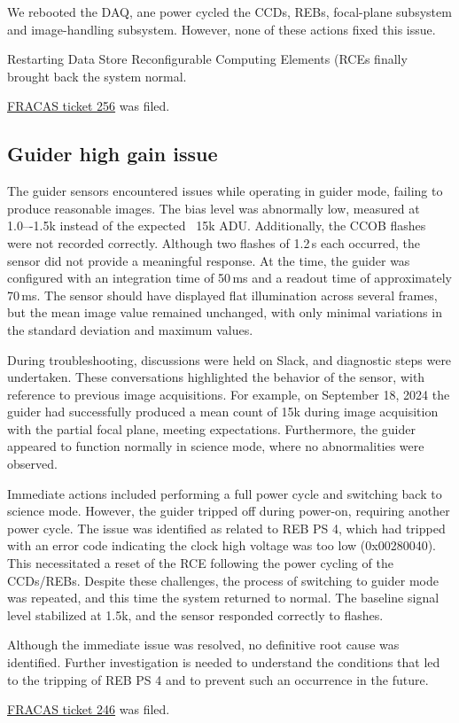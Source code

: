 We rebooted the DAQ, ane power cycled the CCDs, REBs, focal-plane subsystem and image-handling subsystem.  However, none of these actions fixed this issue. 

Restarting Data Store Reconfigurable Computing Elements (RCEs finally brought back the system normal. 

\href{https://rubinobs.atlassian.net/browse/FRACAS-256}{FRACAS ticket 256} was filed. 

\clearpage
\subsection{Guider high gain issue}\label{sec:guider:highgain}

The guider sensors encountered issues while operating in guider mode, failing to produce reasonable images. The bias level was abnormally low, measured at 1.0–-1.5k instead of the expected ~15k ADU. Additionally, the CCOB flashes were not recorded correctly. Although two flashes of 1.2\,s each occurred, the sensor did not provide a meaningful response. At the time, the guider was configured with an integration time of 50\,ms and a readout time of approximately 70\,ms. The sensor should have displayed flat illumination across several frames, but the mean image value remained unchanged, with only minimal variations in the standard deviation and maximum values.

During troubleshooting, discussions were held on Slack, and diagnostic steps were undertaken. These conversations highlighted the behavior of the sensor, with reference to previous image acquisitions. For example, on September 18, 2024 the guider had successfully produced a mean count of 15k during image acquisition with the partial focal plane, meeting expectations. Furthermore, the guider appeared to function normally in science mode, where no abnormalities were observed.

Immediate actions included performing a full power cycle and switching back to science mode. However, the guider tripped off during power-on, requiring another power cycle. The issue was identified as related to REB PS 4, which had tripped with an error code indicating the clock high voltage was too low (0x00280040). This necessitated a reset of the RCE following the power cycling of the CCDs/REBs. Despite these challenges, the process of switching to guider mode was repeated, and this time the system returned to normal. The baseline signal level stabilized at 1.5k, and the sensor responded correctly to flashes.

Although the immediate issue was resolved, no definitive root cause was identified. Further investigation is needed to understand the conditions that led to the tripping of REB PS 4 and to prevent such an occurrence in the future.

\href{https://rubinobs.atlassian.net/browse/FRACAS-246}{FRACAS ticket 246} was filed. 

\clearpage